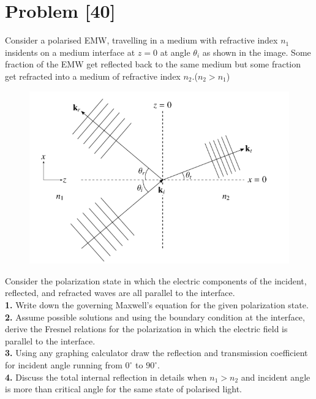 \documentclass[12pt, a4paper]{article}
\begin{document}
\section*{Problem \hfill \textbf{[40]}}
Consider a polarised EMW, travelling in a medium with refractive index $n_1$ insidents 
on a medium interface at $z=0$ at angle $\theta_i$ as shown in the image. Some fraction of the EMW 
get reflected back to the same medium but some fraction get refracted into a medium of refractive 
index $n_2$.($n_2 > n_1$)
\begin{figure}[h]
    \centering
    \includegraphics*[scale=0.4]{figs/EMW_polarization.png}
\end{figure}

\noindent
Consider the polarization state in which the electric components of the incident, reflected, and 
refracted waves are all parallel to the interface. \\
\textbf{1.} Write down the governing Maxwell's equation for the given polarization state.\\
\textbf{2.} Assume possible solutions and using the boundary condition at the interface, derive
the Fresnel relations for the polarization in which the electric field is parallel to the interface.\\
\textbf{3.} Using any graphing calculator draw the reflection and transmission coefficient for 
incident angle running from $0^{\circ}$ to $90^{\circ}$.\\
\textbf{4.} Discuss the total internal reflection in details when $n_1>n_2$ and incident angle is 
more than critical angle for the same state of polarised light. 
\end{document}
